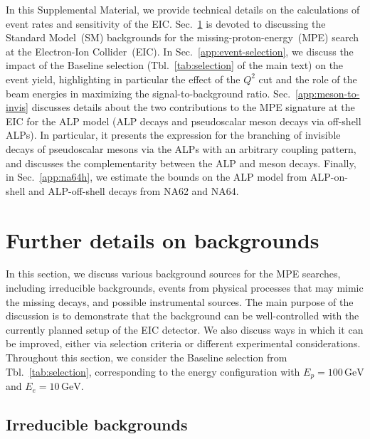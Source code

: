 \documentclass[aps,prd,preprintnumbers,superscriptaddress,nofootinbib,floatfix,twocolumn,notitlepage,reprint]{revtex4-2}
\newcommand{\GeV}{\mathrm{GeV}}
\begin{document}
In this Supplemental Material, we provide technical details on the calculations of event rates and sensitivity of the EIC.
Sec.~\ref{app:backgrounds} is devoted to discussing the Standard Model~(SM) backgrounds for the missing-proton-energy~(MPE) search at the Electron-Ion Collider~(EIC). 
In Sec.~\ref{app:event-selection}, we discuss the impact of the Baseline selection (Tbl.~\ref{tab:selection} of the main text) on the event yield, highlighting in particular the effect of the $Q^{2}$ cut and the role of the beam energies in maximizing the signal-to-background ratio. 
Sec.~\ref{app:meson-to-invis} discusses details about the two contributions to the MPE signature at the EIC for the ALP model (ALP decays and pseudoscalar meson decays via off-shell ALPs). 
In particular, it presents the expression for the branching of invisible decays of pseudoscalar mesons via the ALPs with an arbitrary coupling pattern, and discusses the complementarity between the ALP and meson decays. 
Finally, in Sec.~\ref{app:na64h}, we estimate the bounds on the ALP model from ALP-on-shell and ALP-off-shell decays from NA62 and NA64.

\section{Further details on backgrounds}
\label{app:backgrounds}

In this section, we discuss various background sources for the MPE searches, including irreducible backgrounds, events from physical processes that may mimic the missing decays, and possible instrumental sources. 
The main purpose of the discussion is to demonstrate that the background can be well-controlled with the currently planned setup of the EIC detector.
We also discuss ways in which it can be improved, either via selection criteria or different experimental considerations.
Throughout this section, we consider the Baseline selection from Tbl.~\ref{tab:selection}, corresponding to the energy configuration with $E_{p} = 100\,\GeV$ and $E_{e} = 10\,\GeV$.

\subsection{Irreducible backgrounds}
\end{document}
